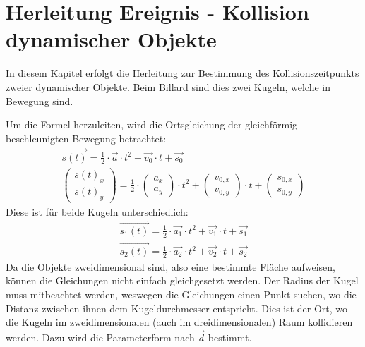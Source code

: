 \section{Herleitung Ereignis - Kollision dynamischer Objekte}\label{anhang:herleitung:event:dynamicObjectCollision}
In diesem Kapitel erfolgt die Herleitung zur Bestimmung des Kollisionszeitpunkts zweier dynamischer Objekte. Beim Billard
sind dies zwei Kugeln, welche in Bewegung sind.

Um die Formel herzuleiten, wird die Ortsgleichung der gleichförmig beschleunigten Bewegung betrachtet:
\begin{align}
    \vec{s(t)} = \frac{1}{2} \cdot \vec{a} \cdot t^2 + \vec{v_0} \cdot t + \vec{s_0}\\
    \begin{pmatrix}s(t)_x\\s(t)_y\end{pmatrix} = \frac{1}{2} \cdot \begin{pmatrix}a_x\\a_y\end{pmatrix} \cdot t^2 + \begin{pmatrix}v_{0, x}\\v_{0, y}\end{pmatrix} \cdot t + \begin{pmatrix}s_{0, x}\\s_{0, y}\end{pmatrix}
\end{align}
Diese ist für beide Kugeln unterschiedlich:
\begin{align}
    \vec{s_1(t)} = \frac{1}{2} \cdot \vec{a_1} \cdot t^2 + \vec{v_{1}} \cdot t + \vec{s_{1}}\\
    \vec{s_2(t)} = \frac{1}{2} \cdot \vec{a_2} \cdot t^2 + \vec{v_{2}} \cdot t + \vec{s_{2}}
\end{align}
Da die Objekte zweidimensional sind, also eine bestimmte Fläche aufweisen, können die Gleichungen nicht einfach gleichgesetzt
werden. Der Radius der Kugel muss mitbeachtet werden, weswegen die Gleichungen einen Punkt suchen, wo die
Distanz zwischen ihnen dem Kugeldurchmesser entspricht. Dies ist der Ort, wo die Kugeln im zweidimensionalen
(auch im dreidimensionalen) Raum kollidieren werden. Dazu wird die Parameterform nach $\vec{d}$ bestimmt.
